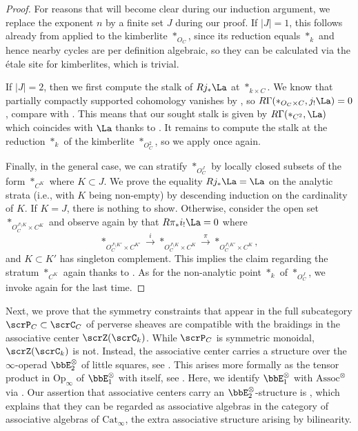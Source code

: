 \documentclass[10pt, reqno]{amsart}
\theoremstyle{plain}
\theoremstyle{definition}
\numberwithin{equation}{section}
\begin{document}
	\begin{proof}For reasons that will become clear during our induction argument, we replace the exponent $n$ by a finite set $J$ during our proof.
		If $\lvert J\rvert =1$, this follows already from \cite[Theorem 4.7]{GL24} applied to the kimberlite $*_{O_C}$, since its reduction equals $*_{k}$ and hence nearby cycles are per definition algebraic, so they can be calculated via the étale site for kimberlites, which is trivial.
		
		If $\lvert J\rvert =2$, then we first compute the stalk of $Rj_*\La$ at $*_{ k\times C}$. We know that partially compactly supported cohomology vanishes by \cite[Theorem IV.5.3]{FS21}, so $R\Gamma(*_{O_C \times C}, j_!\La)=0$, compare with \cite[Proposition V.4.2, Remark V.4.3]{FS21}. This means that our sought stalk is given by $R\Gamma(*_{C^2},\La)$ which coincides with $\La$ thanks to \cite[Theorem 19.5]{Sch17}. It remains to compute the stalk at the reduction $*_k$ of the kimberlite $*_{O_C^2}$, so we apply \cite[Theorem 4.7]{GL24} once again.
		
		Finally, in the general case, we can stratify $*_{O_C^J}$ by locally closed subsets of the form $*_{C^K}$ where $K\subset J$. We prove the equality $Rj_*\La=\La$ on the analytic strata (i.e., with $K$ being non-empty) by descending induction on the cardinality of $K$. If $K=J$, there is nothing to show. Otherwise, consider the open set $*_{O_C^{J\setminus K} \times C^K}$ and observe again by \cite[Theorem IV.5.3]{FS21} that $R\pi_*i_!\La=0$ where \begin{equation}
			*_{O_C^{J \setminus K'} \times C^{K'}} \xrightarrow{i} *_{O_C^{J \setminus K} \times C^K} \xrightarrow{\pi}  *_{O_C^{J \setminus K'} \times C^K},
		\end{equation} and $K \subset K'$ has singleton complement. This implies the claim regarding the stratum $*_{C^K}$ again thanks to \cite[Theorem 19.5]{Sch17}. As for the non-analytic point $*_k$ of $*_{O_C^J}$, we invoke \cite[Theorem 4.7]{GL24} again for the last time.   
	\end{proof}
	
	Next, we prove that the symmetry constraints that appear in the full subcategory $\scrP_C  \subset \scrC_C$ of perverse sheaves are compatible with the braidings in the associative center $\scrZ(\scrC_k)$. While $\scrP_C$ is symmetric monoidal, $\scrZ(\scrC_k)$ is not. Instead, the associative center carries a structure over the $\infty$-operad $\bbE_2^\otimes$ of little squares, see \cite[Definition 5.1.0.2]{Lur17}. This arises more formally as the tensor product in $\mathrm{Op}_\infty$ of $\bbE_1^\otimes$ with itself, see \cite[Theorem 5.1.2.2]{Lur17}. Here, we identify $\bbE_1^\otimes$ with $\mathrm{Assoc}^\otimes$ via \cite[Example 5.1.0.7]{Lur17}. Our assertion that associative centers carry an $\bbE_2^\otimes$-structure is \cite[Remark 5.3.1.13]{Lur17}, which explains that they can be regarded as associative algebras in the category of associative algebras of $\mathrm{Cat}_{\infty}$, the extra associative structure arising by bilinearity.
	
\end{document}
